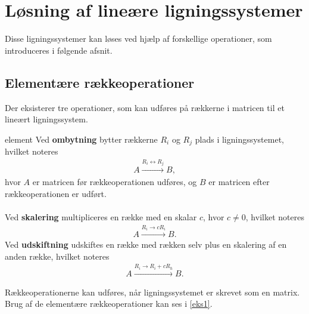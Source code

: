 \newpage
\section{Løsning af lineære ligningssystemer}
%
Disse ligningssystemer kan løses ved hjælp af forskellige operationer,
som introduceres i følgende afsnit.
%
\subsection{Elementære rækkeoperationer}
Der eksisterer tre operationer, som kan udføres på rækkerne i matricen til et lineært ligningssystem.
%
\begin{defn}{}{element}
Ved \textbf{ombytning} bytter rækkerne $R_i$ og $R_j$ plads i ligningssystemet, hvilket noteres
\begin{align*}
A \xrightarrow{R_i \leftrightarrow R_j} B, 
\end{align*}
hvor $A$ er matricen før rækkeoperationen udføres, og $B$ er matricen efter rækkeoperationen er udført.\\\\
Ved \textbf{skalering} multipliceres en række med en skalar $c$, hvor $c \neq 0$, hvilket noteres
\begin{align*}
A \xrightarrow{R_i \rightarrow cR_i} B.
\end{align*}
Ved \textbf{udskiftning} udskiftes en række med rækken selv plus en skalering af en anden række, hvilket noteres
\begin{align*}
A \xrightarrow{R_i \rightarrow R_i + cR_h} B.
\end{align*}
%
\end{defn}
\noindent
Rækkeoperationerne kan udføres, når ligningssystemet er skrevet som en matrix. Brug af de elementære rækkeoperationer kan ses i \ref{eks1}.
\\
%
%
